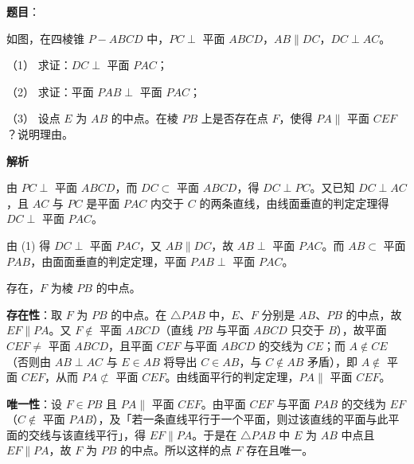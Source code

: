\begin{answer}

\textbf{题目}：

如图，在四棱锥 \(P-ABCD\) 中，\(PC\perp\) 平面 \(ABCD\)，\(AB\parallel DC\)，\(DC\perp AC\)。
\nopagebreak[4]
\begin{center}\end{center}
\nopagebreak[4]
（1） 求证：\(DC\perp\) 平面 \(PAC\)；

（2） 求证：平面 \(PAB\perp\) 平面 \(PAC\)；

（3） 设点 \(E\) 为 \(AB\) 的中点。在棱 \(PB\) 上是否存在点 \(F\)，使得 \(PA\parallel\) 平面 \(CEF\)？说明理由。

\textbf{解析}


由 \(PC\perp\) 平面 \(ABCD\)，而 \(DC\subset\) 平面 \(ABCD\)，得 \(DC\perp PC\)。又已知 \(DC\perp AC\)，且 \(AC\) 与 \(PC\) 是平面 \(PAC\) 内交于 \(C\) 的两条直线，由线面垂直的判定定理得 \(DC\perp\) 平面 \(PAC\)。


由 (1) 得 \(DC\perp\) 平面 \(PAC\)，又 \(AB\parallel DC\)，故 \(AB\perp\) 平面 \(PAC\)。而 \(AB\subset\) 平面 \(PAB\)，由面面垂直的判定定理，平面 \(PAB\perp\) 平面 \(PAC\)。



存在，\(F\) 为棱 \(PB\) 的中点。

\textbf{存在性}：取 \(F\) 为 \(PB\) 的中点。在 \(\triangle PAB\) 中，\(E\)、\(F\) 分别是 \(AB\)、\(PB\) 的中点，故 \(EF\parallel PA\)。又 \(F\notin\) 平面 \(ABCD\)（直线 \(PB\) 与平面 \(ABCD\) 只交于 \(B\)），故平面 \(CEF\neq\) 平面 \(ABCD\)，且平面 \(CEF\) 与平面 \(ABCD\) 的交线为 \(CE\)；而 \(A\notin CE\)（否则由 \(AB\perp AC\) 与 \(E\in AB\) 将导出 \(C\in AB\)，与 \(C\notin AB\) 矛盾），即 \(A\notin\) 平面 \(CEF\)，从而 \(PA\not\subset\) 平面 \(CEF\)。由线面平行的判定定理，\(PA\parallel\) 平面 \(CEF\)。

\textbf{唯一性}：设 \(F\in PB\) 且 \(PA\parallel\) 平面 \(CEF\)。由平面 \(CEF\) 与平面 \(PAB\) 的交线为 \(EF\)（\(C\notin\) 平面 \(PAB\)），及「若一条直线平行于一个平面，则过该直线的平面与此平面的交线与该直线平行」，得 \(EF\parallel PA\)。于是在 \(\triangle PAB\) 中 \(E\) 为 \(AB\) 中点且 \(EF\parallel PA\)，故 \(F\) 为 \(PB\) 的中点。所以这样的点 \(F\) 存在且唯一。




\end{answer}
